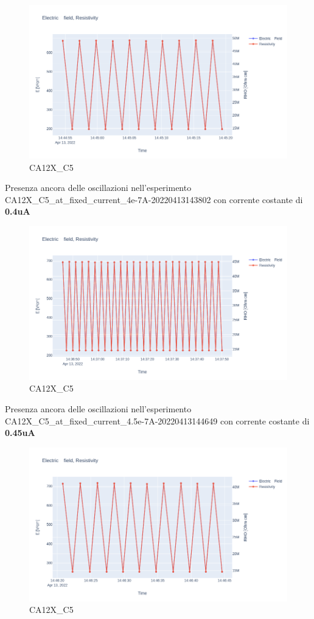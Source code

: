 \documentclass[11pt]{article}
\begin{document}
\begin{figure}
\centering
\includegraphics{CA12X_C5-3_5.png}
\caption{CA12X\_C5}
\end{figure}

Presenza ancora delle oscillazioni nell'esperimento
CA12X\_C5\_at\_fixed\_current\_4e-7A-20220413143802 con corrente
costante di \textbf{0.4uA}

\begin{figure}
\centering
\includegraphics{CA12X_C5-4.png}
\caption{CA12X\_C5}
\end{figure}

Presenza ancora delle oscillazioni nell'esperimento
CA12X\_C5\_at\_fixed\_current\_4.5e-7A-20220413144649 con corrente
costante di \textbf{0.45uA}

\begin{figure}
\centering
\includegraphics{CA12X_C5-4_5.png}
\caption{CA12X\_C5}
\end{figure}
\end{document}

